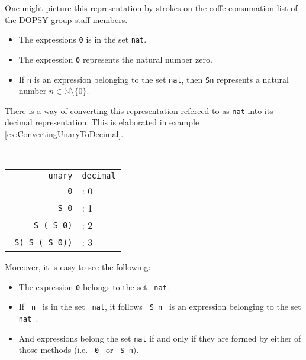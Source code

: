 	 One might picture this representation by strokes on the coffe consumation list of the DOPSY group staff members.  
	  \begin{itemize}
	  \item The expressions \lstinline!0! is in the set \lstinline!nat!.
	  \item The expression \lstinline!0! represents the natural number zero. 
	  \item If \lstinline!n! is an expression belonging to the set \lstinline!nat!, then \lstinline!Sn! represents a natural number $n\in\mathbb{N}\setminus\{ 0\}$.  
	  \end{itemize}
	  There is a way of converting this representation refereed to as \lstinline!nat! into its decimal representation. 
	  This is elaborated in example \ref{ex:ConvertingUnaryToDecimal}.
	  \begin{example} \label{ex:ConvertingUnaryToDecimal} ~\\%
	  \begin{center}  
		  \begin{tabular} {r l}
		  
			  \texttt{unary}				& \texttt{decimal}	\\
			  \texttt{\lstinline!0!} 		&: 0 				\\
			  \texttt{\lstinline! S 0!}  	&: 1				\\
			  \texttt{\lstinline! S ( S 0)!}	&: 2			\\
			  \texttt{\lstinline! S( S ( S 0))!}	&: 3		\\
			    
		  \end{tabular}
		  \end{center}
	  \end{example}
	  Moreover, it is easy to see the following: 
	  \begin{itemize}
	  \item The expression \lstinline!0! belongs to the set \lstinline! nat!.
	  \item If \lstinline! n ! is in the set \lstinline! nat!, it follows \lstinline! S n ! is an expression belonging to the set \lstinline! nat !.
	  \item And expressions belong the set \lstinline!nat! if and only if they are  formed by either of those methods (i.e. \lstinline! 0 ! or  \lstinline! S n!). 
	  \end{itemize}  
